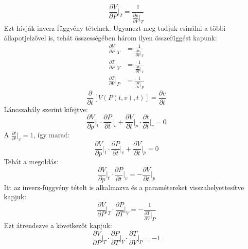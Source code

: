\documentclass[../main.tex]{subfiles}
\begin{document}
\begin{equation}
    \frac{\partial V}{\partial P}\bigg|_{T} = \frac{1}{\frac{\partial p}{\partial V}\big|_{T}}
\end{equation}
Ezt hívják inverz-függvény tételnek. Ugyanezt meg tudjuk csinálni a többi állapotjelzővel is, tehát összességében három ilyen összefüggést kapunk:
\begin{equation}
    \begin{aligned}
        \frac{\partial V}{\partial P}\bigg|_{T} &= \frac{1}{\frac{\partial p}{\partial V}\big|_{T}} \\
        \frac{\partial T}{\partial P}\bigg|_{V} &= \frac{1}{\frac{\partial p}{\partial T}\big|_{V}} \\
        \frac{\partial T}{\partial V}\bigg|_{P} &= \frac{1}{\frac{\partial V}{\partial T}\big|_{P}} 
    \end{aligned}
\end{equation}
\begin{equation}
    \frac{\partial}{\partial t} \left[V(P(t, v), t)\right] = \frac{\partial v}{\partial t}
\end{equation}
Láncszabály szerint kifejtve:
\begin{equation}
    \frac{\partial V}{\partial p}\bigg|_{t} \cdot \frac{\partial P}{\partial t}\bigg|_{v} + \frac{\partial V}{\partial t}\bigg|_{p} \cdot \frac{\partial t}{\partial t}\bigg|_{v} = 0
\end{equation}
A $\frac{\partial t}{\partial t}\big|_{v} = 1$, így marad:
\begin{equation}
    \frac{\partial V}{\partial p}\bigg|_{t} \cdot \frac{\partial P}{\partial t}\bigg|_{v} + \frac{\partial V}{\partial t}\bigg|_{p} = 0
\end{equation}
Tehát a megoldás:
\begin{equation}
     \frac{\partial V}{\partial p}\bigg|_{t} \cdot \frac{\partial P}{\partial t}\bigg|_{v} = - \frac{\partial V}{\partial t}\bigg|_{p}
\end{equation}
Itt az inverz-függvény tételt is alkalmazva és a paramétereket visszahelyettesítve kapjuk:
\begin{equation}
     \frac{\partial V}{\partial P}\bigg|_{T} \cdot \frac{\partial P}{\partial T}\bigg|_{V} = - \frac{1}{\frac{\partial T}{\partial V}\big|_{P}}
\end{equation}
Ezt átrendezve a következőt kapjuk:
\begin{equation}
     \frac{\partial V}{\partial P}\bigg|_{T} \cdot \frac{\partial P}{\partial T}\bigg|_{V} \cdot \frac{\partial T}{\partial V}\bigg|_{P} = -1
\end{equation}
\end{document}

